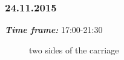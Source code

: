 \subsubsection{24.11.2015}
\textit{\textbf{Time frame:}} 17:00-21:30 \newline


\begin{figure}[H]
	\begin{minipage}[h]{1\linewidth}
		\caption{two sides of the carriage}
	\end{minipage}
\end{figure}

